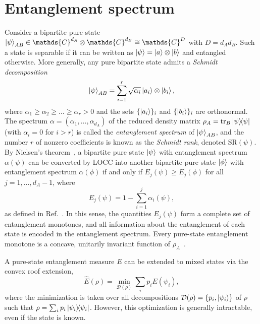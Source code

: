 \documentclass[aps,pra,twocolumn,superscriptaddress]{revtex4-2}
\renewcommand{\a}{\alpha}
\newcommand{\C}{\mathds{C}}
\begin{document}
\section{Entanglement spectrum}

Consider a bipartite pure state $\ket{\psi}_{AB} \in \C^{d_A} \otimes \C^{d_B} \cong \C^D$ with $D = d_Ad_B$. Such a state is separable if it can be written as $\ket{\psi}=\ket{a}\otimes\ket{b}$ and entangled otherwise. More generally, any pure bipartite state admits a \emph{Schmidt decomposition}
\begin{equation}\label{eq:SchmidtDec}
    \ket{\psi}_{AB} = \sum_{i=1}^r \sqrt{\a_i}\ket{a_i}\otimes\ket{b_i},
\end{equation}
where $\a_1\geq\a_2\geq\dots\geq\a_r>0$ and the sets $\{\ket{a_i}\}_i$ and $\{\ket{b_i}\}_i$ are orthonormal. The spectrum $\a=(\a_1,\dots,\a_{d_A})$ of the reduced density matrix $\rho_A=\tr_B\dyad{\psi}$ (with $\a_i=0$ for $i>r$) is called the {\em entanglement spectrum} of $\ket{\psi}_{AB}$, and the number $r$ of nonzero coefficients is known as the {\em Schmidt rank}, denoted $\mathrm{SR}(\psi)$.
By Nielsen's theorem~\cite{Nielsen1999MajLOCC}, a bipartite pure state $\ket{\psi}$ with entanglement spectrum $\a(\psi)$ can be converted by LOCC into another bipartite pure state $\ket{\phi}$ with entanglement spectrum $\a(\phi)$ if and only if $E_j(\psi)\geq E_j(\phi)$ for all $j=1,\dots,d_A-1$, where
\begin{equation}\label{eq:Vidal}
    E_j(\psi)=1-\sum_{i=1}^{j} \a_i(\psi),
\end{equation}
as defined in Ref.~\cite{Vidal_1999}. In this sense, the quantities $E_j(\psi)$ form a complete set of entanglement monotones, and all information about the entanglement of each state is encoded in the entanglement spectrum. Every pure-state entanglement monotone is a concave, unitarily invariant function of $\rho_A$~\cite{Vidal_2000}.

A pure-state entanglement measure $E$ can be extended to mixed states via the convex roof extension,
\begin{equation}\label{eq:CRoof}
    \widehat{E}(\rho) = \min_{\mathcal{D}(\rho)} \sum_i p_i E(\psi_i),
\end{equation}
where the minimization is taken over all decompositions
$\mathcal{D}(\rho)=\{p_i,\ket{\psi_i}\}$ of $\rho$ such that $\rho = \sum_i p_i \dyad{\psi_i}$. However, this optimization is generally intractable, even if the state is known.
\end{document}
